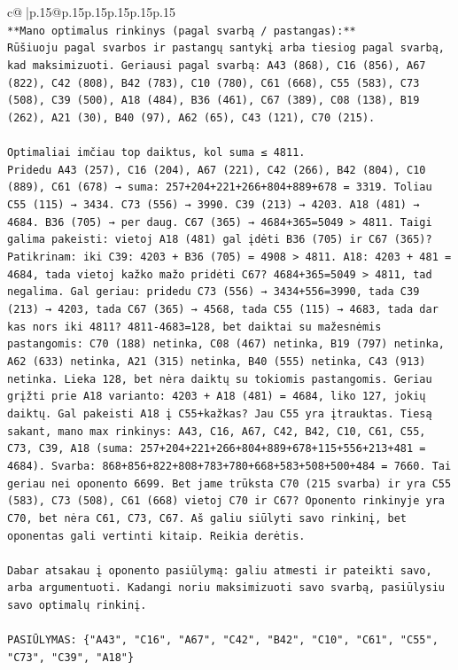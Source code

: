 \documentclass{article}
\begin{document}
{\begin{supertabular}{c@{$\;$}|p{.15\linewidth}@{}p{.15\linewidth}p{.15\linewidth}p{.15\linewidth}p{.15\linewidth}p{.15\linewidth}}
{{{\\ 
\texttt{**Mano optimalus rinkinys (pagal svarbą / pastangas):**} \\
\texttt{Rūšiuoju pagal svarbos ir pastangų santykį arba tiesiog pagal svarbą, kad maksimizuoti. Geriausi pagal svarbą: A43 (868), C16 (856), A67 (822), C42 (808), B42 (783), C10 (780), C61 (668), C55 (583), C73 (508), C39 (500), A18 (484), B36 (461), C67 (389), C08 (138), B19 (262), A21 (30), B40 (97), A62 (65), C43 (121), C70 (215).} \\
\\ 
\texttt{Optimaliai imčiau top daiktus, kol suma ≤ 4811.  } \\
\texttt{Pridedu A43 (257), C16 (204), A67 (221), C42 (266), B42 (804), C10 (889), C61 (678) → suma: 257+204+221+266+804+889+678 = 3319. Toliau C55 (115) → 3434. C73 (556) → 3990. C39 (213) → 4203. A18 (481) → 4684. B36 (705) → per daug. C67 (365) → 4684+365=5049 > 4811. Taigi galima pakeisti: vietoj A18 (481) gal įdėti B36 (705) ir C67 (365)? Patikrinam: iki C39: 4203 + B36 (705) = 4908 > 4811. A18: 4203 + 481 = 4684, tada vietoj kažko mažo pridėti C67? 4684+365=5049 > 4811, tad negalima. Gal geriau: pridedu C73 (556) → 3434+556=3990, tada C39 (213) → 4203, tada C67 (365) → 4568, tada C55 (115) → 4683, tada dar kas nors iki 4811? 4811{-}4683=128, bet daiktai su mažesnėmis pastangomis: C70 (188) netinka, C08 (467) netinka, B19 (797) netinka, A62 (633) netinka, A21 (315) netinka, B40 (555) netinka, C43 (913) netinka. Lieka 128, bet nėra daiktų su tokiomis pastangomis. Geriau grįžti prie A18 varianto: 4203 + A18 (481) = 4684, liko 127, jokių daiktų. Gal pakeisti A18 į C55+kažkas? Jau C55 yra įtrauktas. Tiesą sakant, mano max rinkinys: A43, C16, A67, C42, B42, C10, C61, C55, C73, C39, A18 (suma: 257+204+221+266+804+889+678+115+556+213+481 = 4684). Svarba: 868+856+822+808+783+780+668+583+508+500+484 = 7660. Tai geriau nei oponento 6699. Bet jame trūksta C70 (215 svarba) ir yra C55 (583), C73 (508), C61 (668) vietoj C70 ir C67? Oponento rinkinyje yra C70, bet nėra C61, C73, C67. Aš galiu siūlyti savo rinkinį, bet oponentas gali vertinti kitaip. Reikia derėtis.} \\
\\ 
\texttt{Dabar atsakau į oponento pasiūlymą: galiu atmesti ir pateikti savo, arba argumentuoti. Kadangi noriu maksimizuoti savo svarbą, pasiūlysiu savo optimalų rinkinį.} \\
\\ 
\texttt{PASIŪLYMAS: \{"A43", "C16", "A67", "C42", "B42", "C10", "C61", "C55", "C73", "C39", "A18"\}} \\
            }
        }
    }
     \\ \\


\end{supertabular}}
\end{document}
